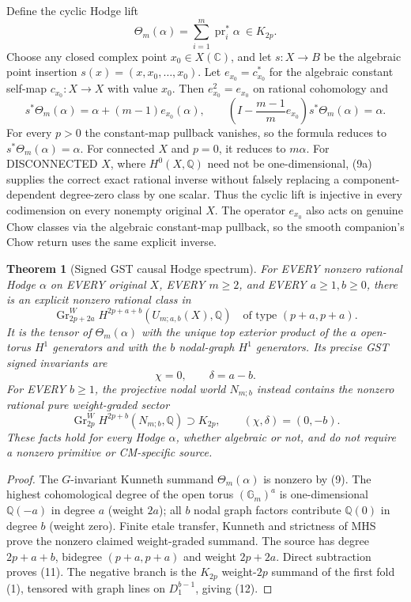 \documentclass[11pt]{article}
\newtheorem{theorem}{Theorem}
\begin{document}
Define the cyclic Hodge lift
\[
 \Theta_m(\alpha)=\sum_{i=1}^m\operatorname{pr}_i^*\alpha
                 \ \in K_{2p}.
 \tag{9}
\]
Choose any closed complex point $x_0\in X(\mathbb C)$,
and let $s:X\to B$ be the algebraic point insertion
$s(x)=(x,x_0,\ldots,x_0)$. Let
$e_{x_0}=c_{x_0}^*$ for the algebraic constant self-map
$c_{x_0}:X\to X$ with value $x_0$.
Then $e_{x_0}^2=e_{x_0}$ on rational cohomology and
\[
 s^*\Theta_m(\alpha)
    =\alpha+(m-1)e_{x_0}(\alpha),\qquad
 \left(I-\frac{m-1}{m}e_{x_0}\right)
 s^*\Theta_m(\alpha)=\alpha.                \tag{9a}
\]
For every $p>0$ the constant-map pullback vanishes,
so the formula reduces to $s^*\Theta_m(\alpha)=\alpha$.
For connected $X$ and $p=0$, it reduces to $m\alpha$.
For DISCONNECTED $X$, where $H^0(X,\mathbb Q)$ need not be
one-dimensional, (9a) supplies the correct exact rational
inverse without falsely replacing a component-dependent
degree-zero class by one scalar. Thus the cyclic lift is
injective in every codimension on every nonempty original $X$.
The operator $e_{x_0}$ also acts on genuine Chow classes
via the algebraic constant-map pullback, so the smooth
companion's Chow return uses the same explicit inverse.

\begin{theorem}[Signed GST causal Hodge spectrum]
For EVERY nonzero rational Hodge $\alpha$ on EVERY original $X$,
EVERY $m\ge2$, and EVERY $a\ge1,b\ge0$, there is an
explicit nonzero rational class in
\[
  \operatorname{Gr}^{W}_{2p+2a}
       H^{2p+a+b}(U_{m;a,b}(X),\mathbb Q)
 \quad\text{of type }(p+a,p+a).
 \tag{10}
\]
It is the tensor of $\Theta_m(\alpha)$ with the unique
top exterior product of the $a$ open-torus $H^1$ generators
and with the $b$ nodal-graph $H^1$ generators.
Its precise GST signed invariants are
\[
 \boxed{\chi=0,\qquad \delta=a-b.}
 \tag{11}
\]
For EVERY $b\ge1$, the projective nodal world $N_{m;b}$
instead contains the nonzero rational pure weight-graded sector
\[
 \operatorname{Gr}^{W}_{2p}
 H^{2p+b}(N_{m;b},\mathbb Q)\supset K_{2p},
 \qquad(\chi,\delta)=(0,-b).
 \tag{12}
\]
These facts hold for every Hodge $\alpha$, whether
algebraic or not, and do not require a nonzero
primitive or CM-specific source.
\end{theorem}
\begin{proof}
The $G$-invariant Kunneth summand $\Theta_m(\alpha)$
is nonzero by (9). The highest cohomological degree of
the open torus $(\mathbb G_m)^a$ is one-dimensional
$\mathbb Q(-a)$ in degree $a$ (weight $2a$);
all $b$ nodal graph factors contribute
$\mathbb Q(0)$ in degree $b$ (weight zero).
Finite etale transfer, Kunneth and strictness of MHS
prove the nonzero claimed weight-graded summand.
The source has degree $2p+a+b$, bidegree
$(p+a,p+a)$ and weight $2p+2a$. Direct subtraction
proves (11).  The negative branch is the $K_{2p}$
weight-$2p$ summand of the first fold (1), tensored
with graph lines on $D_1^{b-1}$, giving (12).
\end{proof}
\end{document}
